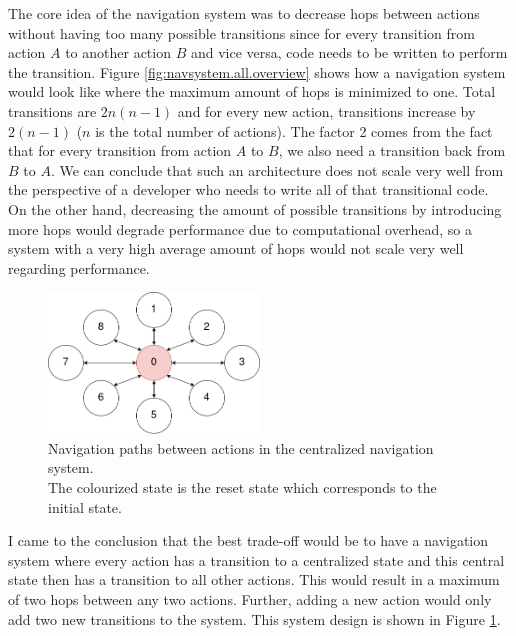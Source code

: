 The core idea of the navigation system was to decrease hops between actions without having too many possible transitions since for every transition from action $A$ to another action $B$ and vice versa, code needs to be written to perform the transition. Figure \ref{fig:navsystem.all.overview} shows how a navigation system would look like where the maximum amount of hops is minimized to one. Total transitions are $2n(n-1)$ and for every new action, transitions increase by $2(n-1)$ ($n$ is the total number of actions). The factor 2 comes from the fact that for every transition from action $A$ to $B$, we also need a transition back from $B$ to $A$. We can conclude that such an architecture does not scale very well from the perspective of a developer who needs to write all of that transitional code. \\
On the other hand, decreasing the amount of possible transitions by introducing more hops would degrade performance due to computational overhead, so a system with a very high average amount of hops would not scale very well regarding performance.

\begin{figure}
\centering
\includegraphics[width=0.5\textwidth]{figures/navigationsystem-diagram/navigationsystem-central-overview.png}
\caption[Navigation paths in centralized navigation system]{Navigation paths between actions in the centralized navigation system. \\The colourized state is the reset state which corresponds to the initial state.}
\label{fig:navsystem.central.overview}
\end{figure}

I came to the conclusion that the best trade-off would be to have a navigation system where every action has a transition to a centralized state and this central state then has a transition to all other actions. This would result in a maximum of two hops between any two actions. Further, adding a new action would only add two new transitions to the system. This system design is shown in Figure \ref{fig:navsystem.central.overview}.

